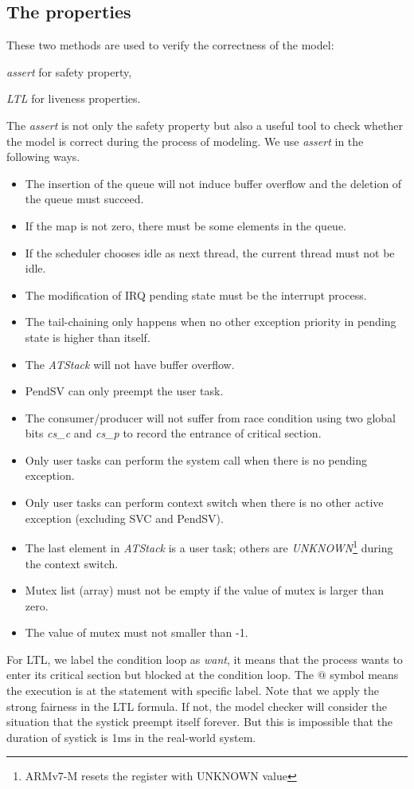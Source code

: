 \subsection{The properties} These two methods are used to verify the correctness of the model:
\begin{enumerate*}[label={\roman*)},font={\bfseries}]
\item \textit{assert} for safety property,
\item \textit{LTL} for liveness properties.
\end{enumerate*}
The \textit{assert} is not only the safety property but also a useful tool to check whether the model is correct during the process of modeling. We use \textit{assert} in the following ways.
\begin{itemize}
\item The insertion of the queue will not induce buffer overflow and the deletion of the queue must succeed.
\item If the map is not zero, there must be some elements in the queue.
\item If the scheduler chooses idle as next thread, the current thread must not be idle.
\item The modification of IRQ pending state must be the interrupt process.
\item The tail-chaining only happens when no other exception priority in pending state is higher than itself.
\item The \textit{ATStack} will not have buffer overflow.
\item PendSV can only preempt the user task.
\item The consumer/producer will not suffer from race condition using two global bits \textit{cs\_c} and \textit{cs\_p} to record the entrance of critical section.
\item Only user tasks can perform the system call when there is no pending exception.
\item Only user tasks can perform context switch when there is no other active exception (excluding SVC and PendSV).
\item The last element in \textit{ATStack} is a user task; others are \textit{UNKNOWN}\footnote{ARMv7-M resets the register with UNKNOWN value} during the context switch.
\item Mutex list (array) must not be empty if the value of mutex is larger than zero.
\item The value of mutex must not smaller than -1.
\end{itemize}
For LTL, we label the condition loop as \textit{want}, it means that the process wants to enter its critical section but blocked at the condition loop. The $@$ symbol means the execution is at the statement with specific label. Note that we apply the strong fairness in the LTL formula. If not, the model checker will consider the situation that the systick preempt itself forever. But this is impossible that the duration of systick is 1ms in the real-world system.

